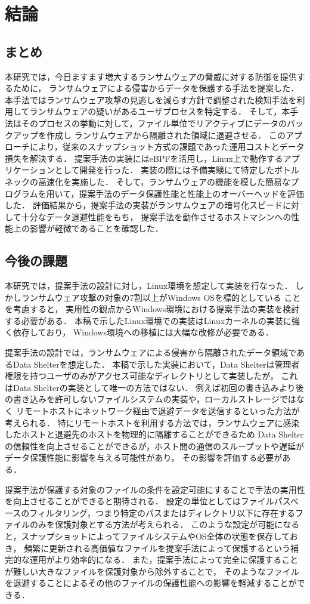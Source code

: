 \chapter{結論}
\section{まとめ}
本研究では，今日ますます増大するランサムウェアの脅威に対する防御を提供するために，
ランサムウェアによる侵害からデータを保護する手法を提案した．
本手法ではランサムウェア攻撃の見逃しを減らす方針で調整された検知手法を利用してランサムウェアの疑いがあるユーザプロセスを特定する．
そして，本手法はそのプロセスの挙動に対して，ファイル単位でリアクティブにデータのバックアップを作成し
ランサムウェアから隔離された領域に退避させる．
このアプローチにより，従来のスナップショット方式の課題であった運用コストとデータ損失を解決する．
提案手法の実装にはeBPFを活用し，Linux上で動作するアプリケーションとして開発を行った．
実装の際には予備実験にて特定したボトルネックの高速化を実施した．
そして，ランサムウェアの機能を模した簡易なプログラムを用いて，提案手法のデータ保護性能と性能上のオーバーヘッドを評価した．
評価結果から，提案手法の実装がランサムウェアの暗号化スピードに対して十分なデータ退避性能をもち，
提案手法を動作させるホストマシンへの性能上の影響が軽微であることを確認した．

\section{今後の課題}
本研究では，提案手法の設計に対し，Linux環境を想定して実装を行なった．
しかしランサムウェア攻撃の対象の7割以上がWindows OSを標的としている \cite{trendmicro-report} ことを考慮すると，
実用性の観点からWindows環境における提案手法の実装を検討する必要がある．
本稿で示したLinux環境での実装はLinuxカーネルの実装に強く依存しており，
Windows環境への移植には大幅な改修が必要である．

提案手法の設計では，ランサムウェアによる侵害から隔離されたデータ領域であるData Shelterを想定した．
本稿で示した実装において，Data Shelterは管理者権限を持つユーザのみがアクセス可能なディレクトリとして実装したが，
これはData Shelterの実装として唯一の方法ではない．
例えば初回の書き込みより後の書き込みを許可しないファイルシステムの実装や，ローカルストレージではなく
リモートホストにネットワーク経由で退避データを送信するといった方法が考えられる．
特にリモートホストを利用する方法では，ランサムウェアに感染したホストと退避先のホストを物理的に隔離することができるため
Data Shelterの信頼性を向上させることができるが，ホスト間の通信のスループットや遅延がデータ保護性能に影響を与える可能性があり，
その影響を評価する必要がある．

提案手法が保護する対象のファイルの条件を設定可能にすることで手法の実用性を向上させることができると期待される．
設定の単位としてはファイルパスベースのフィルタリング，つまり特定のパスまたはディレクトリ以下に存在するファイルのみを保護対象とする方法が考えられる．
このような設定が可能になると，スナップショットによってファイルシステムやOS全体の状態を保存しておき，
頻繁に更新される高価値なファイルを提案手法によって保護するという補完的な運用がより効率的になる．
また，提案手法によって完全に保護することが難しい大きなファイルを保護対象から除外することで，
そのようなファイルを退避することによるその他のファイルの保護性能への影響を軽減することができる．
